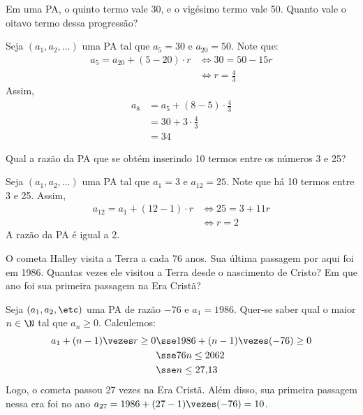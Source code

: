 \begin{example}
Em uma PA, o quinto termo vale 30, e o vigésimo termo vale 50. Quanto vale o oitavo termo dessa progressão?
\end{example}

\begin{solution}
Seja $(a_1, a_2, \dots)$ uma PA tal que $a_5 = 30$ e $a_{20}=50$. Note que:
%
\begin{align*}
a_5 = a_{20}+(5-20)\cdot r & \iff 30 = 50-15r\\
& \iff r = \frac 4 3
\end{align*}
%
Assim,
%
\begin{align*}
a_8 & = a_5+(8-5) \cdot \frac 4 3 \\
& = 30 + 3 \cdot \frac 4 3 \\
& =  34
\end{align*}
\end{solution}

\begin{example}
Qual a razão da PA que se obtém inserindo 10 termos entre os números 3 e 25?
\end{example}

\begin{solution}
Seja $(a_1, a_2, \dots)$ uma PA tal que $a_1 = 3$ e $a_{12} = 25$. Note que há 10 termos entre 3 e 25. Assim,
%
\begin{align*}
a_{12} = a_1 + (12-1)\cdot r & \iff 25 = 3 + 11r\\
& \iff r = 2
\end{align*}
%
A razão da PA é igual a 2.
\end{solution}

\begin{example}
O cometa Halley visita a Terra a cada 76 anos. Sua última passagem por aqui foi em 1986. Quantas vezes ele visitou a Terra desde o nascimento de Cristo? Em que ano foi sua primeira passagem na Era Cristã?
\end{example}

\begin{solution}
	Seja $(a_1, a_2, \etc)$ uma PA de razão $-76$ e $a_1 = 1986$. Quer-se saber qual o maior $n \in \N$ tal que $a_n \ge 0$. Calculemos:
	\begin{align*}
		a_1+(n-1) \vezes r\ge 0 & \sse 1986+(n-1)\vezes(-76) \ge 0 \\
		                        & \sse 76n \le 2062 \\
		                        & \sse n \le 27{,}13
	\end{align*}
	Logo, o cometa passou 27 vezes na Era Cristã. Além disso, sua primeira passagem nessa era foi no ano $a_{27} = 1986+(27-1)\vezes(-76)=10$.
\end{solution}

